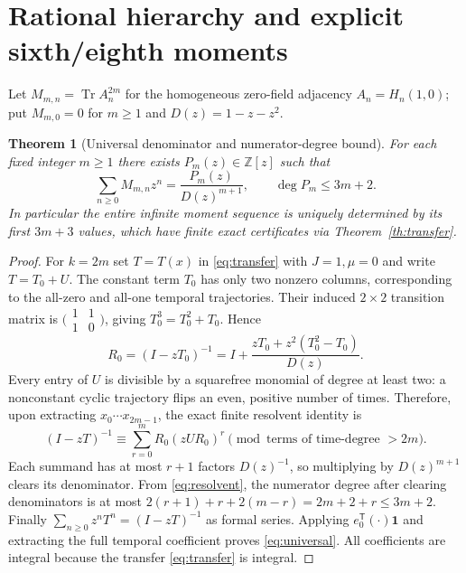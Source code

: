 \documentclass[10pt,a4paper]{article}
\newtheorem{theorem}{Theorem}[section]
\newcommand{\Tr}{\operatorname{Tr}}
\begin{document}
\section{Rational hierarchy and explicit sixth/eighth moments}
Let $M_{m,n}=\Tr A_n^{2m}$ for the homogeneous zero-field adjacency $A_n=H_n(1,0)$; put $M_{m,0}=0$ for $m\ge1$ and $D(z)=1-z-z^2$.
\begin{theorem}[Universal denominator and numerator-degree bound]\label{th:denom}
For each fixed integer $m\ge1$ there exists $P_m(z)\in\mathbb Z[z]$ such that
\begin{equation}\label{eq:universal}
\boxed{\sum_{n\ge0}M_{m,n}z^n
=\frac{P_m(z)}{D(z)^{m+1}},\qquad \deg P_m\le3m+2.}
\end{equation}
In particular the entire infinite moment sequence is uniquely determined by its first $3m+3$ values, which have finite exact certificates via Theorem~\ref{th:transfer}.
\end{theorem}
\begin{proof}
For $k=2m$ set $T=T(x)$ in \eqref{eq:transfer} with $J=1,\mu=0$ and write $T=T_0+U$. The constant term $T_0$ has only two nonzero columns, corresponding to the all-zero and all-one temporal trajectories. Their induced $2\times2$ transition matrix is
$\bigl(\begin{smallmatrix}1&1\\1&0\end{smallmatrix}\bigr)$, giving $T_0^3=T_0^2+T_0$. Hence
\begin{equation}\label{eq:resolvent}
R_0=(I-zT_0)^{-1}
=I+\frac{zT_0+z^2(T_0^2-T_0)}{D(z)}.
\end{equation}
Every entry of $U$ is divisible by a squarefree monomial of degree at least two: a nonconstant cyclic trajectory flips an even, positive number of times. Therefore, upon extracting $x_0\cdots x_{2m-1}$, the exact finite resolvent identity is
\begin{equation}\label{eq:finite}
(I-zT)^{-1}\equiv\sum_{r=0}^{m}R_0(zUR_0)^r
\pmod{\text{terms of time-degree }>2m}.
\end{equation}
Each summand has at most $r+1$ factors $D(z)^{-1}$, so multiplying by $D(z)^{m+1}$ clears its denominator. From \eqref{eq:resolvent}, the numerator degree after clearing denominators is at most
$2(r+1)+r+2(m-r)=2m+2+r\le3m+2$.
Finally $\sum_{n\ge0} z^n T^n=(I-zT)^{-1}$ as formal series. Applying $e_0^{\mathsf T}(\cdot)\boldsymbol1$ and extracting the full temporal coefficient proves \eqref{eq:universal}. All coefficients are integral because the transfer \eqref{eq:transfer} is integral.
\end{proof}
\end{document}
